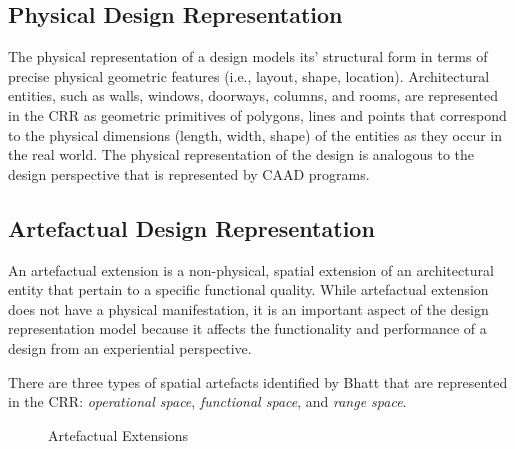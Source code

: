 \documentclass[12pt]{ucthesis}
\begin{document}
\subsection{Physical Design Representation}
The physical representation of a design models its' structural form in terms of precise physical geometric features (i.e., layout, shape, location). Architectural entities, such as walls, windows, doorways, columns, and rooms, are represented in the CRR as geometric primitives of polygons, lines and points that correspond to the physical dimensions (length, width, shape) of the entities as they occur in the real world. The physical representation of the design is analogous to the design perspective that is represented by CAAD programs. 


\subsection{Artefactual Design Representation}
An artefactual extension is a non-physical, spatial extension of an architectural entity that pertain to a specific functional quality. While artefactual extension does not have a physical manifestation, it is an important aspect of the design representation model because it affects the functionality and performance of a design from an experiential perspective. 

There are three types of spatial artefacts identified by Bhatt\cite{Bhatt} that are represented in the CRR: \emph{operational space}, \emph{functional space}, and \emph{range space}.

\begin{figure}[H]
 \centering
 \hspace{7 mm}
  \hspace{7 mm}
 \caption{Artefactual Extensions}
\label{artefactual-extensions}
\end{figure}
\end{document}
